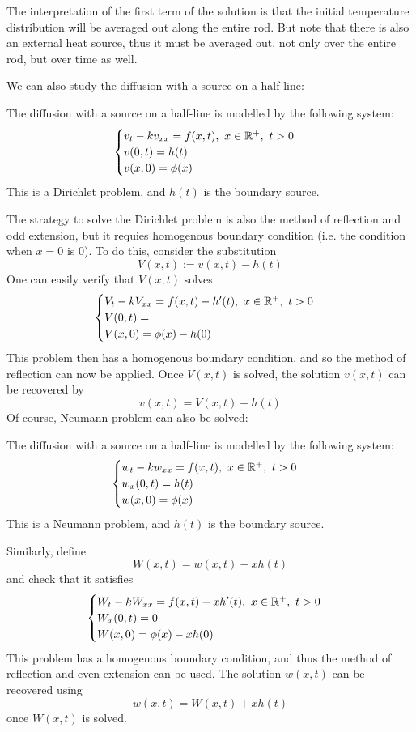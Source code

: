 \begin{re}
    The interpretation of the first term of the solution is that the initial temperature distribution will be averaged out along the entire rod. But note that there is also an external heat source, thus it must be averaged out, not only over the entire rod, but over time as well.
\end{re}

We can also study the diffusion with a source on a half-line:

\medskip 

\begin{defn} 
    The diffusion with a source on a half-line is modelled by the following system:
    \[\begin{cases}
        v_t - kv_{xx} = f(x,t),\ x\in {\mathbb R}^+,\ t>0 \\
        v(0,t) = h(t) \\
        v(x,0) = \phi(x)
    \end{cases}\]
    This is a Dirichlet problem, and $h(t)$ is the boundary source.
\end{defn}

The strategy to solve the Dirichlet problem is also the method of reflection and odd extension, but it requies homogenous boundary condition (i.e. the condition when $x=0$ is $0$). To do this, consider the substitution
\[V(x,t) := v(x,t) - h(t)\]
One can easily verify that $V(x,t)$ solves
\[\begin{cases}
    V_t - kV_{xx} = f(x,t)-h'(t),\ x\in {\mathbb R}^+,\ t>0 \\
    V(0,t) =  \\
    V(x,0) = \phi(x) -h(0)
\end{cases}\]
This problem then has a homogenous boundary condition, and so the method of reflection can now be applied. Once $V(x,t)$ is solved, the solution $v(x,t)$ can be recovered by
\[v(x,t) = V(x,t) + h(t)\]
Of course, Neumann problem can also be solved:

\medskip

\begin{defn} 
    The diffusion with a source on a half-line is modelled by the following system:
    \[\begin{cases}
        w_t - kw_{xx} = f(x,t),\ x\in {\mathbb R}^+,\ t>0 \\
        w_x(0,t) = h(t) \\
        w(x,0) = \phi(x)
    \end{cases}\]
    This is a Neumann problem, and $h(t)$ is the boundary source.
\end{defn}
Similarly, define 
\[W(x,t) = w(x,t)-xh(t)\]
and check that it satisfies
\[\begin{cases}
        W_t - kW_{xx} = f(x,t)-xh'(t),\ x\in {\mathbb R}^+,\ t>0 \\
        W_x(0,t) = 0 \\
        W(x,0) = \phi(x)-xh(0)
\end{cases}\]
This problem has a homogenous boundary condition, and thus the method of reflection and even extension can be used. The solution $w(x,t)$ can be recovered using 
\[w(x,t) = W(x,t) + xh(t)\]
once $W(x,t)$ is solved.

